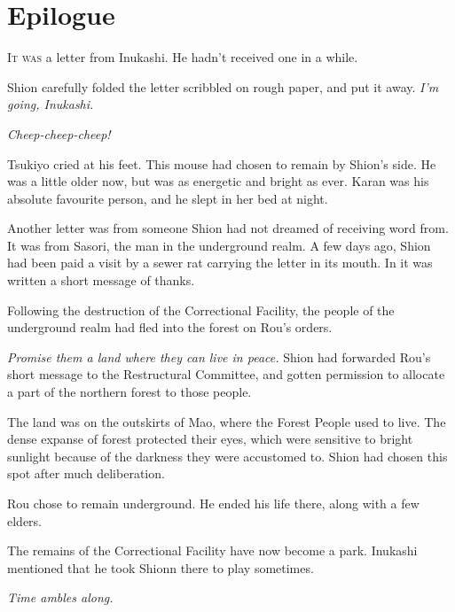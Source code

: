
\chapter{Epilogue}


\lettrine{I}{t was} a letter from Inukashi. He hadn't received one in a while.


Shion carefully folded the letter scribbled on rough paper, and put it
away. \emph{I'm going, Inukashi.}

\emph{Cheep-cheep-cheep!}

Tsukiyo cried at his feet. This mouse had chosen to remain by Shion's
side. He was a little older now, but was as energetic and bright as
ever. Karan was his absolute favourite person, and he slept in her bed
at night.

Another letter was from someone Shion had not dreamed of receiving word
from. It was from Sasori, the man in the underground realm. A few days
ago, Shion had been paid a visit by a sewer rat carrying the letter in
its mouth. In it was written a short message of thanks.


Following the destruction of the Correctional Facility, the people of
the underground realm had fled into the forest on Rou's orders.

\emph{Promise them a land where they can live in peace.} Shion had forwarded
Rou's short message to the Restructural Committee, and gotten permission
to allocate a part of the northern forest to those people.

The land was on the outskirts of Mao, where the Forest People used to
live. The dense expanse of forest protected their eyes, which were
sensitive to bright sunlight because of the darkness they were
accustomed to. Shion had chosen this spot after much deliberation.

Rou chose to remain underground. He ended his life there, along with a
few elders.

The remains of the Correctional Facility have now become a park.
Inukashi mentioned that he took Shionn there to play sometimes.

\emph{Time ambles along.}

